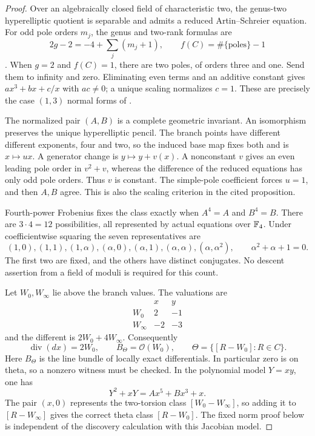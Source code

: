 \begin{proof}
Over an algebraically closed field of
characteristic two, the genus-two
hyperelliptic quotient is separable and
admits a reduced Artin--Schreier equation.
For odd pole orders $m_j$, the genus and
two-rank formulas are
\[
 2g-2=-4+\sum_j(m_j+1),\qquad
 f(C)=\#\{\text{poles}\}-1
\]
\citep[Notation 1.1, author p.~2]{A_ElkinPries2013}.
When $g=2$ and $f(C)=1$, there are two
poles, of orders three and one. Send
them to infinity and zero. Eliminating
even terms and an additive constant gives
$ax^3+bx+c/x$ with $ac\ne0$; a unique
scaling normalizes $c=1$.
These are precisely the case $(1,3)$
normal forms of
\citet[Proposition 14, author p.~14]
{A_CardonaNartPujolas2005}.

The normalized pair $(A,B)$ is a complete
geometric invariant. An isomorphism
preserves the unique hyperelliptic pencil.
The branch points have different different
exponents, four and two, so the induced
base map fixes both and is $x\mapsto ux$.
A generator change is $y\mapsto y+v(x)$.
A nonconstant $v$ gives an even leading
pole order in $v^2+v$, whereas the difference
of the reduced equations has only odd
pole orders. Thus $v$ is constant.
The simple-pole coefficient forces $u=1$,
and then $A,B$ agree. This is also the
scaling criterion in the cited proposition.

Fourth-power Frobenius fixes the class
exactly when $A^4=A$ and $B^4=B$.
There are $3\cdot4=12$ possibilities,
all represented by actual equations
over $\mathbb F_4$. Under coefficientwise
squaring the seven representatives are
\[
 (1,0),(1,1),(1,\alpha),(\alpha,0),
 (\alpha,1),(\alpha,\alpha),(\alpha,\alpha^2),
 \qquad \alpha^2+\alpha+1=0.                               \tag{C2.93}
\]
The first two are fixed, and the others
have distinct conjugates. No descent
assertion from a field of moduli is
required for this count.

Let $W_0,W_\infty$ lie above the branch
values. The valuations are
\[
 \begin{array}{c|rr}
       &x&y\\\hline
 W_0&2&-1\\
 W_\infty&-2&-3
 \end{array}
\]
and the different is $2W_0+4W_\infty$.
Consequently
\[
 \operatorname{div}(dx)=2W_0,
 \qquad B_\Theta=\mathcal O(W_0),
 \qquad \Theta=\{[R-W_0]:R\in C\}.                         \tag{C2.94}
\]
Here $B_\Theta$ is the line bundle of
locally exact differentials. In particular
zero is on theta, so a nonzero witness
must be checked. In the polynomial model
$Y=xy$, one has
\[
                 Y^2+xY=Ax^5+Bx^3+x.
\]
The pair $(x,0)$ represents the two-torsion
class $[W_0-W_\infty]$, so adding it to
$[R-W_\infty]$ gives the correct theta
class $[R-W_0]$. The fixed norm proof
below is independent of the discovery
calculation with this Jacobian model.


\end{proof}
